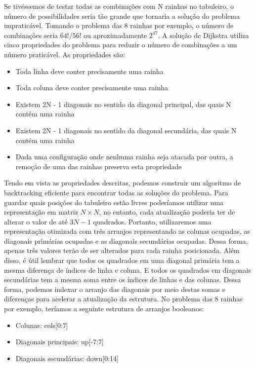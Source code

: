 \documentclass{article}
\begin{document}
Se tivéssemos de testar todas as combinações com N rainhas no tabuleiro, o número de possibilidades seria
tão grande que tornaria a solução do problema impraticável. Tomando o problema das 8 rainhas por exemplo,
o número de combinações seria $ 64!/56! $ ou aproximadamente $ 2^{47} $. A solução de Dijkstra \cite{dijkstra1972} utiliza
cinco propriedades do problema para reduzir o número de combinações a um número praticável. 
As propriedades são:

\begin{itemize}
\item Toda linha deve conter precisamente uma rainha
\item Toda coluna deve conter precisamente uma rainha
\item Existem 2N - 1 diagonais no sentido da diagonal principal, das quais N contém uma rainha
\item Existem 2N - 1 diagonais no sentido da diagonal secundária, das quais N contém uma rainha
\item Dada uma configuração onde nenhuma rainha seja atacada por outra, a remoção de uma das rainhas preserva esta propriedade
\end{itemize}

Tendo em vista as propriedades descritas, podemos construir um algoritmo de backtracking eficiente para encontrar todas as
soluções do problema. Para guardar quais posições do tabuleiro estão livres poderíamos utilizar uma representação em matriz
$ N \times N $, no entanto, cada atualização poderia ter de alterar o valor de até $ 3N - 1 $ quadrados. Portanto, utilizaremos
uma representação otimizada com três arranjos representando as colunas ocupadas, as diagonais primárias ocupadas e as diagonais 
secundárias ocupadas. Dessa forma, apenas três valores terão de ser alterados para cada rainha posicionada. Além disso, é útil 
lembrar que todos os quadrados em uma diagonal primária tem a mesma diferença de índices de linha e coluna. E todos os quadrados 
em diagonais secundárias tem a mesma soma entre os índices de linhas e das colunas. Dessa forma, podemos indexar o 
arranjo das diagonais por meio destas somas e diferenças para acelerar a atualização da estrutura. No problema das 8 rainhas
por exemplo, teríamos a seguinte estrutura de arranjos booleanos:

\begin{itemize}
\item Colunas: cols[0:7]
\item Diagonais principais: up[-7:7]
\item Diagonais secundárias: down[0:14]
\end{itemize}
\end{document}
